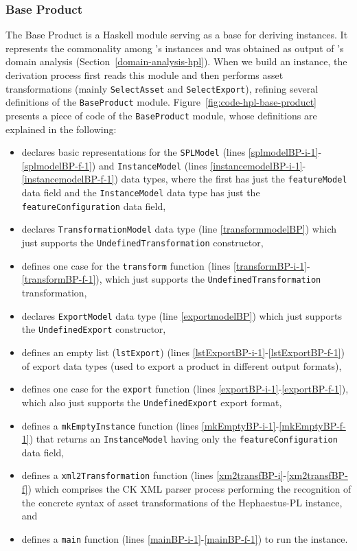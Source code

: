 \subsubsection{Base Product} \label{base-product}

The Base Product is a Haskell module serving as a base for deriving \hpl{}
instances. It represents the commonality among \hpl's instances and was obtained as output of \hpl{}'s domain analysis  (Section~\ref{domain-analysis-hpl}). 
When we build an \hpl{} instance, the derivation process
first reads this module and then performs \hp{} asset transformations (mainly \texttt{SelectAsset} and \texttt{SelectExport}), refining several definitions of the \texttt{BaseProduct} module. Figure~\ref{fig:code-hpl-base-product} presents a piece of code of the \texttt{BaseProduct} module, whose definitions are explained in the following:
\begin{itemize}
\item declares basic representations for the \texttt{SPLModel} (lines \ref{splmodelBP-i-1}-\ref{splmodelBP-f-1})
and \texttt{InstanceModel} (lines \ref{instancemodelBP-i-1}-\ref{instancemodelBP-f-1}) data types, where the first
has just the \texttt{featureModel} data field
and the \texttt{InstanceModel} data type has just the \texttt{featureConfiguration} data field,
\item declares \texttt{TransformationModel} data type (line \ref{transformmodelBP}) which just supports the \texttt{UndefinedTransformation} constructor,
\item defines one case for the \texttt{transform} function (lines \ref{transformBP-i-1}-\ref{transformBP-f-1}), 
which just supports the \texttt{UndefinedTransformation} transformation,
\item declares \texttt{ExportModel} data type (line \ref{exportmodelBP}) which just supports the \texttt{UndefinedExport} constructor,
\item defines an empty list (\texttt{lstExport}) (lines \ref{lstExportBP-i-1}-\ref{lstExportBP-f-1}) of export data types (used to export a product in different output formats),
\item defines one case for the \texttt{export} function (lines \ref{exportBP-i-1}-\ref{exportBP-f-1}), which also just supports the \texttt{UndefinedExport} export format,
\item defines a \texttt{mkEmptyInstance} function (lines \ref{mkEmptyBP-i-1}-\ref{mkEmptyBP-f-1}) that returns an \texttt{InstanceModel} having only the \texttt{featureConfiguration} data field, 
\item defines a \texttt{xml2Transformation} function (lines \ref{xm2transfBP-i}-\ref{xm2transfBP-f}) which comprises the CK XML parser process performing the recognition of the concrete syntax of asset transformations of the Hephaestus-PL instance, and 
\item defines a \texttt{main} function (lines \ref{mainBP-i-1}-\ref{mainBP-f-1}) to run the \hp{} instance.
\end{itemize}


